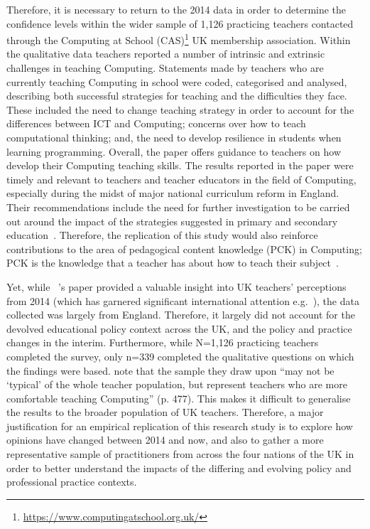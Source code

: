 \documentclass[]{interact}
\theoremstyle{plain}%
\theoremstyle{definition}
\theoremstyle{remark}
\begin{document}
{Therefore, it is necessary to return to the 2014 data in order to
determine the confidence levels within the wider sample of 1,126
practicing teachers contacted through the Computing at School
(CAS)\footnote{\url{https://www.computingatschool.org.uk/}} UK
membership association. Within the qualitative data teachers reported
a number of intrinsic and extrinsic challenges in teaching
Computing. Statements made by teachers who are currently teaching
Computing in school were coded, categorised and analysed, describing
both successful strategies for teaching and the difficulties they
face. These included the need to change teaching strategy in order to
account for the differences between ICT and Computing; concerns over
how to teach computational thinking; and, the need to develop
resilience in students when learning programming. Overall, the paper
offers guidance to teachers on how develop their Computing teaching
skills. The results reported in the paper were timely and relevant to
teachers and teacher educators in the field of Computing, especially
during the midst of major national curriculum reform in England. Their
recommendations include the need for further investigation to be
carried out around the impact of the strategies suggested in primary
and secondary education~\citep{sentance+csizmadia:2017}. Therefore,
the replication of this study would also reinforce contributions to
the area of pedagogical content knowledge (PCK) in Computing; PCK is
the knowledge that a teacher has about how to teach their
subject~\citep{shulman:1986}.

Yet, while ~\citeauthor*{sentance+csizmadia:2017}'s
\citeyear{sentance+csizmadia:2017} paper provided a valuable insight
into UK teachers’ perceptions from 2014 (which has garnered significant
international attention e.g.~\citet{nytcoding:2014}), the data
collected was largely from England. Therefore, it largely did not
account for the devolved educational policy context across the UK, and
the policy and practice changes in the interim. Furthermore, while
N=1,126 practicing teachers completed the survey, only n=339 completed the
qualitative questions on which the findings were
based. \citeauthor*{sentance+csizmadia:2017} note that the sample they
draw upon ``may not be `typical' of the whole teacher population, but
represent teachers who are more comfortable teaching Computing''
(p. 477). This makes it difficult to generalise the results to the
broader population of UK teachers. Therefore, a major justification
for an empirical replication of this research study is to explore how
opinions have changed between 2014 and now, and also to gather a more
representative sample of practitioners from across the four nations of
the UK in order to better understand the impacts of the differing and
evolving policy and professional practice contexts.

}
\end{document}

